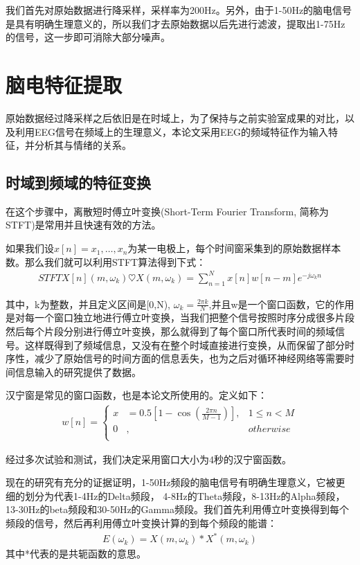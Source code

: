 	我们首先对原始数据进行降采样，采样率为200Hz。另外，由于1-50Hz的脑电信号是具有明确生理意义的，所以我们才去原始数据以后先进行滤波，提取出1-75Hz的信号，这一步即可消除大部分噪声。

\section{脑电特征提取}
	原始数据经过降采样之后依旧是在时域上，为了保持与之前实验室成果的对比，以及利用EEG信号在频域上的生理意义，本论文采用EEG的频域特征作为输入特征，并分析其与情绪的关系。
	\subsection{时域到频域的特征变换}
		在这个步骤中，离散短时傅立叶变换(Short-Term Fourier Transform, 简称为STFT)是常用并且快速有效的方法。
		
		如果我们设$x[n] = {x_1,…, x_n}$为某一电极上，每个时间窗采集到的原始数据样本数。那么我们就可以利用STFT算法得到下式：
		\begin{align}
		STFT{X[n]}(m, \omega_{k}) \heartsuit X(m, \omega_{k}) = \sum_{n = 1}^N x[n]w[n-m]e^{-j\omega_k n}
		\end{align}
		
	其中，k为整数，并且定义区间是[0,N), $\omega_k = \frac{2\pi k}{N}$,并且w是一个窗口函数，它的作用是对每一个窗口独立地进行傅立叶变换，当我们把整个信号按照时序分成很多片段然后每个片段分别进行傅立叶变换，那么就得到了每个窗口所代表时间的频域信号。这样既得到了频域信息，又没有在整个时域直接进行变换，从而保留了部分时序性，减少了原始信号的时间方面的信息丢失，也为之后对循环神经网络等需要时间信息输入的研究提供了数据。
	
	汉宁窗是常见的窗口函数，也是本论文所使用的。定义如下：
	\begin{align}
	 w[n]=\left\{
	\begin{aligned}
	x & = 0.5[1-\cos(\frac{2\pi n}{M - 1})] ,  & 1 \leq n < M\\
	0 &, & otherwise \\
	\end{aligned}
	\right.
	\end{align}
	
	经过多次试验和测试，我们决定采用窗口大小为4秒的汉宁窗函数。
	
	现在的研究有充分的证据证明，1-50Hz频段的脑电信号有明确生理意义，它被更细的划分为代表1-4Hz的Delta频段， 4-8Hz的Theta频段，8-13Hz的Alpha频段，13-30Hz的beta频段和30-50Hz的Gamma频段。我们首先利用傅立叶变换得到每个频段的信号，然后再利用傅立叶变换计算的到每个频段的能谱：
	\begin{align}
	E(\omega_k) = X(m, \omega_k) * X^*(m, \omega_k)
	\end{align}
	其中*代表的是共轭函数的意思。
	
